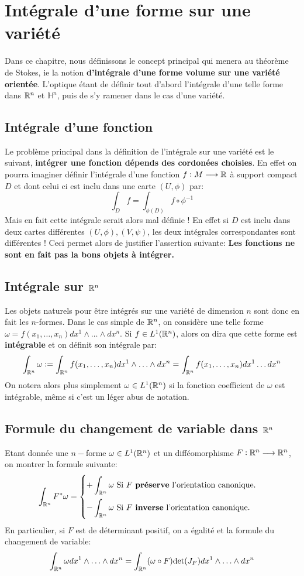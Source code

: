 \chapter{Intégrale d'une forme sur une variété}
Dans ce chapitre, nous définissons le concept principal qui menera au théorème de Stokes, ie la notion \textbf{d'intégrale d'une forme volume sur une variété orientée}. L'optique étant de définir tout d'abord l'intégrale d'une telle forme dans \( \mathbb{R}^n \) et \( \mathbb{H}^n \), puis de s'y ramener dans le cas d'une variété.
\section{Intégrale d'une fonction}
Le problème principal dans la définition de l'intégrale sur une variété est le suivant, \textbf{intégrer une fonction dépends des cordonées choisies}. En effet on pourra imaginer définir l'intégrale d'une fonction \( f : M \longrightarrow \mathbb{R} \) à support compact \( D \) et dont celui ci est inclu dans une carte \((U, \phi)\) par:
\[ 
   \int_D f = \int_{\phi(D)} f  \circ \phi^{-1} 
\] 
Mais en fait cette intégrale serait alors mal définie ! En effet si \( D \) est inclu dans deux cartes différentes \( (U, \phi), (V, \psi) \), les deux intégrales correspondantes sont différentes ! Ceci permet alors de justifier l'assertion suivante: \textbf{Les fonctions ne sont en fait pas la bons objets à intégrer.}
\section{Intégrale sur \( \mathbb{R}^n \)}
Les objets naturels pour être intégrés sur une variété de dimension \( n \) sont donc en fait les \(n\)-formes. Dans le cas simple de \( \mathbb{R}^n \), on considère une telle forme \(\omega = f(x_1, \ldots, x_n) dx^1 \wedge \ldots \wedge dx^n\). Si \( f \in L^1(\mathbb{R}^n) \), alors on dira que cette forme est \textbf{intégrable} et on définit son intégrale par: 
\[ 
   \int_{\mathbb{R}^n} \omega := \int_{\mathbb{R}^n} f(x_1, \ldots, x_n)dx^1 \wedge \ldots \wedge dx^n = \int_{\mathbb{R}^n} f(x_1, \ldots, x_n)dx^1\ldots dx^n
\]
On notera alors plus simplement \(\omega \in L^1(\mathbb{R}^n)\) si la fonction coefficient de \( \omega \) est intégrable, même si c'est un léger abus de notation.
\section{Formule du changement de variable dans \( \mathbb{R}^n \)}
Etant donnée une \( n-\)forme \( \omega \in L^1(\mathbb{R}^n) \) et un difféomorphisme \( F : \mathbb{R}^n \longrightarrow \mathbb{R}^n\), on montrer la formule suivante:
\[ 
   \int_{\R^n} F^*\omega = 
   \begin{cases}
      \displaystyle+\int_{\R^n} \omega \text{ Si $F$ \textbf{préserve} l'orientation canonique.}\vspace{5pt}\\
      \displaystyle-\int_{\R^n} \omega \text{ Si $F$ \textbf{inverse} l'orientation canonique.}
   \end{cases}
\]
En particulier, si \( F \) est de déterminant positif, on a égalité et la formule du changement de variable:
\[ 
   \int_{\mathbb{R}^n} \omega dx^1 \wedge \ldots \wedge dx^n = \int_{\mathbb{R}^n} (\omega \circ F) \text{det}(J_F) dx^1 \wedge \ldots \wedge dx^n
\]
